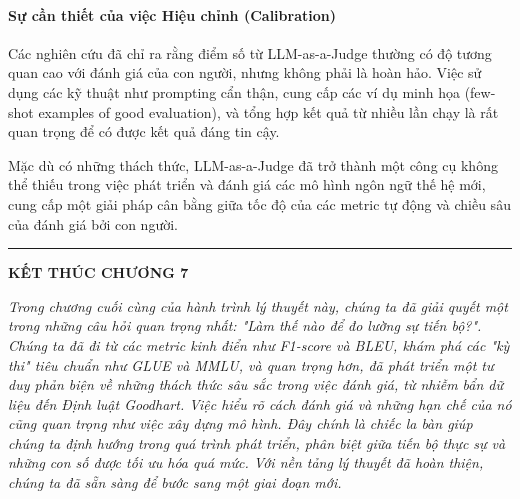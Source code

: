 \paragraph{Sự cần thiết của việc Hiệu chỉnh (Calibration)}
Các nghiên cứu đã chỉ ra rằng điểm số từ LLM-as-a-Judge thường có độ tương quan cao với đánh giá của con người, nhưng không phải là hoàn hảo. Việc sử dụng các kỹ thuật như prompting cẩn thận, cung cấp các ví dụ minh họa (few-shot examples of good evaluation), và tổng hợp kết quả từ nhiều lần chạy là rất quan trọng để có được kết quả đáng tin cậy.

Mặc dù có những thách thức, LLM-as-a-Judge đã trở thành một công cụ không thể thiếu trong việc phát triển và đánh giá các mô hình ngôn ngữ thế hệ mới, cung cấp một giải pháp cân bằng giữa tốc độ của các metric tự động và chiều sâu của đánh giá bởi con người.

\bigskip
\hrule
\bigskip

\begin{center}
    \textbf{\Large KẾT THÚC CHƯƠNG 7}
\end{center}

\textit{Trong chương cuối cùng của hành trình lý thuyết này, chúng ta đã giải quyết một trong những câu hỏi quan trọng nhất: "Làm thế nào để đo lường sự tiến bộ?". Chúng ta đã đi từ các metric kinh điển như F1-score và BLEU, khám phá các "kỳ thi" tiêu chuẩn như GLUE và MMLU, và quan trọng hơn, đã phát triển một tư duy phản biện về những thách thức sâu sắc trong việc đánh giá, từ nhiễm bẩn dữ liệu đến Định luật Goodhart. Việc hiểu rõ cách đánh giá và những hạn chế của nó cũng quan trọng như việc xây dựng mô hình. Đây chính là chiếc la bàn giúp chúng ta định hướng trong quá trình phát triển, phân biệt giữa tiến bộ thực sự và những con số được tối ưu hóa quá mức. Với nền tảng lý thuyết đã hoàn thiện, chúng ta đã sẵn sàng để bước sang một giai đoạn mới.}
